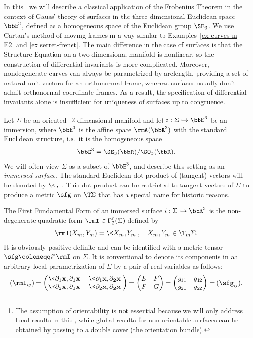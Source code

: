 In this \subsect\ we will describe a classical application of the Frobenius Theorem in the context of Gauss' theory of surfaces in the three-dimensional Euclidean space $\bbE^3$, defined as a homogeneous space of the Euclidean group $\SE_3$. We use Cartan's method of moving frames in a way similar to Examples~\ref{ex curves in E2} and \ref{ex serret-frenet}. The main difference in the case of surfaces is that the Structure Equation on a two-dimensional manifold is nonlinear, so the construction of differential invariants is more complicated. Moreover, nondegenerate curves can always be parametrized by arclength, providing a set of natural unit vectors for an orthonormal frame, whereas surfaces usually don't admit orthonormal coordinate frames. As a result, the specification of differential invariants alone is insufficient for uniqueness of surfaces up to congruence.


Let $\Sigma$ be an oriented\footnote{The assumption of orientability is not essential because we will only address local results in this \subsect, while global results for non-orientable surfaces can be obtained by passing to a double cover (the orientation bundle).} $2$-dimensional manifold and let $i:\Sigma\hookrightarrow \bbE^3$ be an immersion, where $\bbE^3$ is the affine space $\rmA(\bbR^3)$ with the standard Euclidean structure, i.e.\ it is the homogeneous space 
\[\bbE^3=\SE_3(\bbR)\slash \SO_3(\bbR).\]
We will often view $\Sigma$ as a subset of $\bbE^3$, and describe this setting as an \emph{immersed surface}. The standard Euclidean dot product of (tangent) vectors will be denoted by $\<\,,\,\>$. This dot product can be restricted to tangent vectors of $\Sigma$ to produce a metric $\sfg$ on $\T\Sigma$ that has a special name for historic reasons.

\begin{defn}
    The First Fundamental Form of an immersed surface $i:\Sigma\hookrightarrow \bbR^3$ is the non-degenerate quadratic form $\rmI\in\Gamma^0_2(\Sigma)$ defined by 
    \[\rmI(X_m,Y_m)=\<X_m,Y_m\>,\quad X_m,Y_m\in \T_m \Sigma.\]
    It is obviously positive definite and can be identified with a metric tensor $\sfg\coloneqq i^\ast\rmI$ on $\Sigma$. It is conventional to denote its components in an arbitrary local parametrization of $\Sigma$ by a pair of real variables as follows:
    \[(\rmI_{ij})=
    \begin{pmatrix}
        \<\partial_1\bf{x},\partial_1\bf{x}\> & \<\partial_1\bf{x},\partial_2\bf{x}\>\\
        \<\partial_2\bf{x},\partial_1\bf{x}\> & \<\partial_2\bf{x},\partial_2\bf{x}\>
    \end{pmatrix}
    =\begin{pmatrix}
        E&F\\
        F& G
    \end{pmatrix}=\begin{pmatrix}
        g_{11}&g_{12}\\
        g_{21}& g_{22}
    \end{pmatrix}=(\sfg_{ij}).\label{eq fff}\]
\end{defn}


